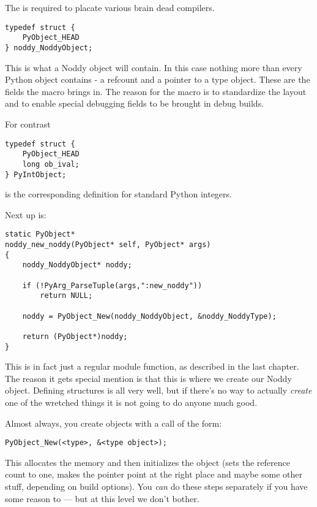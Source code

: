 The  is required to placate various brain dead
compilers.

\begin{verbatim}
typedef struct {
    PyObject_HEAD
} noddy_NoddyObject;
\end{verbatim}

This is what a Noddy object will contain.  In this case nothing more
than every Python object contains - a refcount and a pointer to a type
object.  These are the fields the  macro brings
in.  The reason for the macro is to standardize the layout and to
enable special debugging fields to be brought in debug builds.

For contrast

\begin{verbatim}
typedef struct {
    PyObject_HEAD
    long ob_ival;
} PyIntObject;
\end{verbatim}

is the corresponding definition for standard Python integers.

Next up is:

\begin{verbatim}
static PyObject*
noddy_new_noddy(PyObject* self, PyObject* args)
{
    noddy_NoddyObject* noddy;

    if (!PyArg_ParseTuple(args,":new_noddy")) 
        return NULL;

    noddy = PyObject_New(noddy_NoddyObject, &noddy_NoddyType);

    return (PyObject*)noddy;
}
\end{verbatim}

This is in fact just a regular module function, as described in the
last chapter.  The reason it gets special mention is that this is
where we create our Noddy object.  Defining 
structures is all very well, but if there's no way to actually
\emph{create} one of the wretched things it is not going to do anyone
much good.

Almost always, you create objects with a call of the form:

\begin{verbatim}
PyObject_New(<type>, &<type object>);
\end{verbatim}

This allocates the memory and then initializes the object (sets
the reference count to one, makes the  pointer point at
the right place and maybe some other stuff, depending on build options).
You \emph{can} do these steps separately if you have some reason to
--- but at this level we don't bother.

